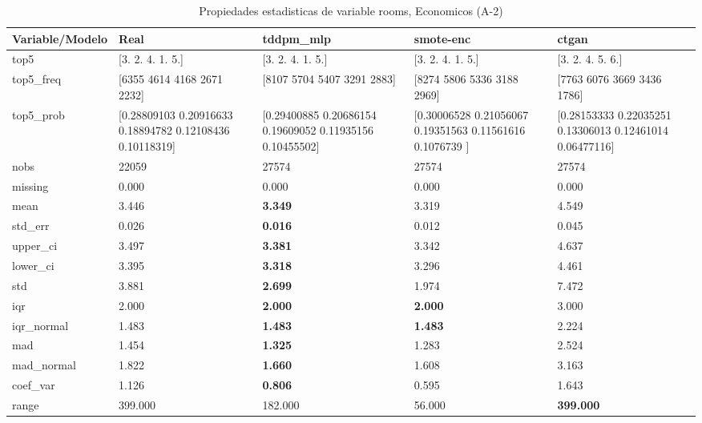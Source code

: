 \begin{table}[H]
\centering
\fontsize{8}{14}\selectfont
\caption{Propiedades  estadisticas de variable rooms, Economicos (A-2)}
\label{table-stats-economicos-a-2-rooms}
\begin{tabular}{|l|m{10em}|m{10em}|m{10em}|m{10em}|}
\hline
 \rowcolor[gray]{0.8}
Variable/Modelo & Real & tddpm\_mlp & smote-enc & ctgan \\
\hline top5 & [3. 2. 4. 1. 5.] & [3. 2. 4. 1. 5.] & [3. 2. 4. 1. 5.] & [3. 2. 4. 5. 6.] \\
\hline top5\_freq & [6355 4614 4168 2671 2232] & [8107 5704 5407 3291 2883] & [8274 5806 5336 3188 2969] & [7763 6076 3669 3436 1786] \\
\hline top5\_prob & [0.28809103 0.20916633 0.18894782 0.12108436 0.10118319] & [0.29400885 0.20686154 0.19609052 0.11935156 0.10455502] & [0.30006528 0.21056067 0.19351563 0.11561616 0.1076739 ] & [0.28153333 0.22035251 0.13306013 0.12461014 0.06477116] \\
\hline nobs & 22059 & 27574 & 27574 & 27574 \\
\hline missing & 0.000 & 0.000 & 0.000 & 0.000 \\
\hline mean & 3.446 & \bfseries 3.349 & 3.319 & \cellcolor[rgb]{0.9, 0.54, 0.52} 4.549 \\
\hline std\_err & 0.026 & \bfseries 0.016 & 0.012 & \cellcolor[rgb]{0.9, 0.54, 0.52} 0.045 \\
\hline upper\_ci & 3.497 & \bfseries 3.381 & 3.342 & \cellcolor[rgb]{0.9, 0.54, 0.52} 4.637 \\
\hline lower\_ci & 3.395 & \bfseries 3.318 & 3.296 & \cellcolor[rgb]{0.9, 0.54, 0.52} 4.461 \\
\hline std & 3.881 & \bfseries 2.699 & 1.974 & \cellcolor[rgb]{0.9, 0.54, 0.52} 7.472 \\
\hline iqr & 2.000 & \bfseries 2.000 & \bfseries 2.000 & \cellcolor[rgb]{0.9, 0.54, 0.52} 3.000 \\
\hline iqr\_normal & 1.483 & \bfseries 1.483 & \bfseries 1.483 & \cellcolor[rgb]{0.9, 0.54, 0.52} 2.224 \\
\hline mad & 1.454 & \bfseries 1.325 & 1.283 & \cellcolor[rgb]{0.9, 0.54, 0.52} 2.524 \\
\hline mad\_normal & 1.822 & \bfseries 1.660 & 1.608 & \cellcolor[rgb]{0.9, 0.54, 0.52} 3.163 \\
\hline coef\_var & 1.126 & \bfseries 0.806 & \cellcolor[rgb]{0.9, 0.54, 0.52} 0.595 & 1.643 \\
\hline range & 399.000 & 182.000 & \cellcolor[rgb]{0.9, 0.54, 0.52} 56.000 & \bfseries 399.000 \\

\end{tabular}
\end{table}
